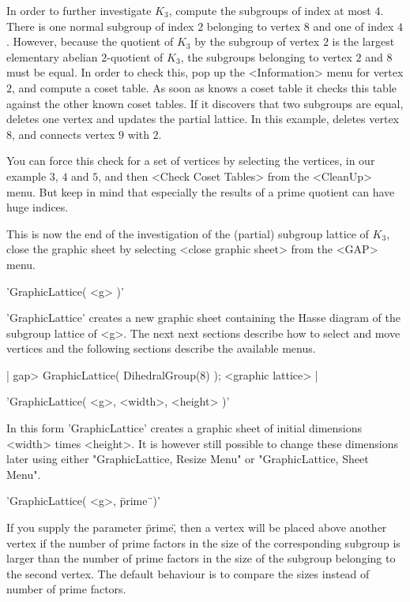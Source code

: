 In order to further investigate $K_3$, compute the  subgroups of index at
most $4$.  There is one normal subgroup of  index $2$ belonging to vertex
$8$ and one of index $4$.  However, because the quotient  of $K_3$ by the
subgroup of vertex $2$ is  the largest elementary abelian $2$-quotient of
$K_3$, the subgroups belonging to vertex  $2$ and $8$ must  be equal.  In
order  to check this,  pop up the  <Information> menu for vertex $2$, and
compute a coset table.  As soon  as {\GAP} knows  a coset table it checks
this table against the other known coset tables. If it discovers that two
subgroups are equal, {\GAP} deletes   one vertex and updates the  partial
lattice.  In this example, {\GAP} deletes vertex $8$, and connects vertex
$9$ with $2$.

You can force this check for a set of vertices by selecting the vertices,
in our example  $3$, $4$ and $5$, and  then <Check Coset Tables> from the
<CleanUp> menu.  But keep in mind that  especially the results of a prime
quotient can have huge indices.

This is  now   the end  of the investigation   of  the (partial) subgroup
lattice of $K_3$,  close the graphic  sheet  by selecting <close  graphic
sheet> from the <GAP> menu.


'GraphicLattice( <g> )'

'GraphicLattice' creates a new graphic sheet containing the Hasse diagram
of the  subgroup lattice of <g>.  The  next next sections describe how to
select  and  move  vertices   and the  following  sections  describe  the
available menus.

|    gap> GraphicLattice( DihedralGroup(8) );
    <graphic lattice> |

'GraphicLattice( <g>, <width>, <height> )'

In   this form  'GraphicLattice'  creates  a   graphic sheet  of  initial
dimensions <width>    times <height>.  It is   however  still possible to
change these dimensions  later using either "GraphicLattice, Resize Menu"
or "GraphicLattice, Sheet Menu".

'GraphicLattice( <g>, \"prime\"\ )'

If you supply the parameter \"prime\", then a vertex will be placed above
another  vertex  if the   number  of prime factors   in  the size  of the
corresponding subgroup is larger than the number of  prime factors in the
size  of  the  subgroup belonging   to  the second  vertex.   The default
behaviour is to compare the sizes instead of number of prime factors.

